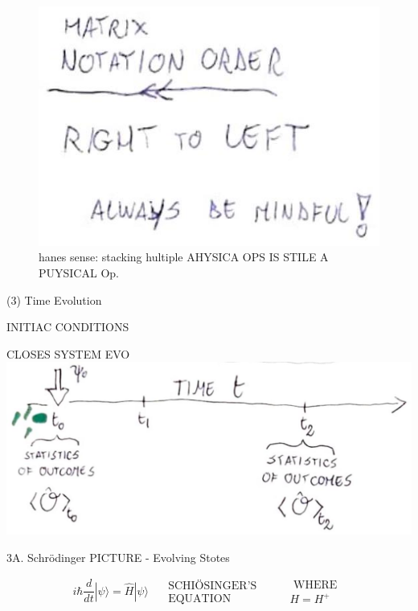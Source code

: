 \documentclass[10pt]{article}
\begin{document}
\begin{figure}[h]
\begin{center}
\captionsetup{labelformat=empty}
\caption{hanes sense: stacking hultiple AHYSICA OPS IS STILE A PUYSICAL Op.}
  \includegraphics[width=\textwidth]{2025_10_16_f02af6fa434c9f0bcc00g-08}
\end{center}
\end{figure}

(3) Time Evolution

INITIAC CONDITIONS

CLOSES SYSTEM EVO\\
\includegraphics[max width=\textwidth, center]{2025_10_16_f02af6fa434c9f0bcc00g-09}

3A. Schrödinger PICTURE - Evolving Stotes

$$
i \hbar \frac{d}{d t}|\psi\rangle=\hat{H}|\psi\rangle \quad \begin{gathered}
\text { SCHIÖSINGER'S } \\
\text { EQUATION }
\end{gathered} \quad \begin{aligned}
& \text { WHERE } \\
& H=H^{+}
\end{aligned}
$$
\end{document}
